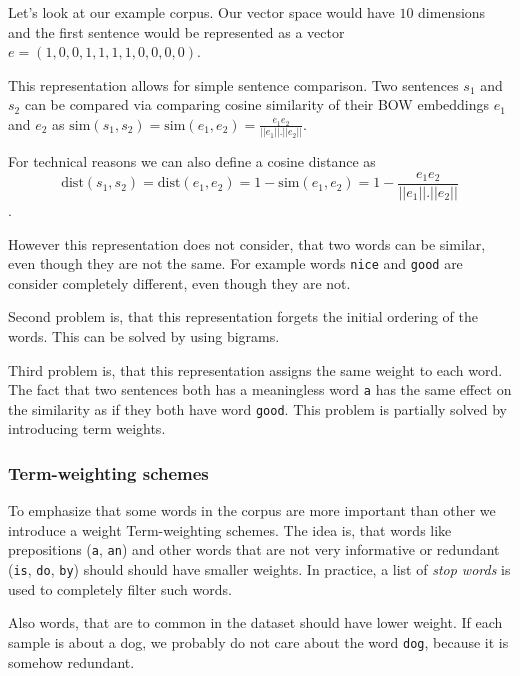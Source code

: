         Let's look at our example corpus. 
        Our vector space would have $10$ dimensions and the first sentence would be represented as a vector 
        $e = (1, 0, 0, 1, 1, 1, 1, 0, 0, 0, 0)$.
        
        This representation allows for simple sentence comparison. 
        Two sentences $s_1$ and $s_2$ can be compared via comparing cosine similarity of their BOW embeddings $e_1$ and $e_2$ as $\mathrm{sim}(s_1, s_2) = \mathrm{sim}(e_1, e_2) = \frac{e_1 e_2}{||e_1||.||e_2||}$.
        
        For technical reasons we can also define a cosine distance as 
        $$\mathrm{dist}(s_1, s_2) = \mathrm{dist}(e_1, e_2) = 1- \mathrm{sim}(e_1, e_2) = 1 - \frac{e_1 e_2}{||e_1||.||e_2||}$$.
        
        However this representation does not consider, that two words can be similar, even though they are not the same.
        For example words \texttt{nice} and \texttt{good} are consider completely different, even though they are not. 
        
        Second problem is, that this representation forgets the initial ordering of the words.
        This can be solved by using bigrams.
        
        Third problem is, that this representation assigns the same weight to each word.
        The fact that two sentences both has a meaningless word \texttt{a} has the same effect on the similarity as 
        if they both have word \texttt{good}. 
        This problem is partially solved by introducing term weights.
        
        \subsubsection{Term-weighting schemes}
        To emphasize that some words in the corpus are more important than other we introduce a weight Term-weighting schemes. 
        The idea is, that words like prepositions (\texttt{a}, \texttt{an}) and other words that are not very informative or redundant  (\texttt{is}, \texttt{do}, \texttt{by}) should should have smaller weights. 
        In practice, a list of \textit{stop words} is used to completely filter such words.
        
        Also words, that are to common in the dataset should have lower weight.
        If each sample is about a dog, we probably do not care about the word \texttt{dog}, because it is somehow redundant.
        
